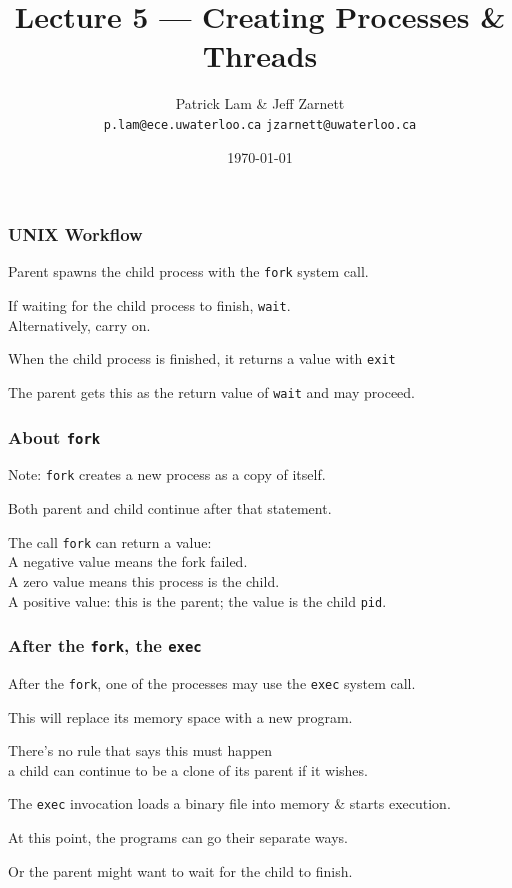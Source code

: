 

\title{Lecture 5 --- Creating Processes \& Threads }

\author{Patrick Lam \& Jeff Zarnett \\ \small \texttt{p.lam@ece.uwaterloo.ca} \texttt{jzarnett@uwaterloo.ca}}
\date{\today}




\begin{frame}
  \titlepage

 \end{frame}

\begin{frame}
\frametitle{UNIX Workflow}

Parent spawns the child process with the \texttt{fork} system call. 

If waiting for the child process to finish, \texttt{wait}.\\
\quad Alternatively, carry on.

When the child process is finished, it returns a value with \texttt{exit} 

The parent gets this as the return value of \texttt{wait} and may proceed.
\end{frame}

\begin{frame}
\frametitle{About \texttt{fork}}

Note: \texttt{fork} creates a new process as a copy of itself.

Both parent and child continue after that statement.

The call \texttt{fork} can return a value:\\
\quad A negative value means the fork failed.\\
\quad A zero value means this process is the child.\\
\quad A positive value: this is the parent; the value is the child \texttt{pid}.

\end{frame}

\begin{frame}
\frametitle{After the \texttt{fork}, the \texttt{exec}}


After the \texttt{fork}, one of the processes may use the \texttt{exec} system call.

This will replace its memory space with a new program. 

There's no rule that says this must happen\\
\quad a child can continue to be a clone of its parent if it wishes.

The \texttt{exec} invocation loads a binary file into memory \& starts execution. 

At this point, the programs can go their separate ways.

Or the parent might want to wait for the child to finish.


\end{frame}

